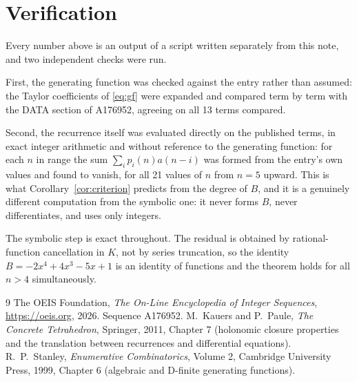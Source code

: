 \documentclass[11pt,a4paper]{article}
\theoremstyle{plain}
\theoremstyle{definition}
\begin{document}
\section{Verification}

Every number above is an output of a script written separately from this note, and two
independent checks were run.

First, the generating function was checked against the entry rather than assumed: the
Taylor coefficients of \eqref{eq:gf} were expanded and compared term by term with the DATA
section of A176952, agreeing on all 13 terms compared.

Second, the recurrence itself was evaluated directly on the published terms, in exact
integer arithmetic and without reference to the generating function: for each $n$ in range
the sum $\sum_{i}p_{i}(n)a(n-i)$ was formed from the entry's own values and found to
vanish, for all 21 values of $n$ from $n=5$ upward. This is what
Corollary~\ref{cor:criterion} predicts from the degree of $B$, and it is a genuinely
different computation from the symbolic one: it never forms $B$, never differentiates, and
uses only integers.

The symbolic step is exact throughout. The residual is obtained by rational-function
cancellation in $K$, not by series truncation, so the identity $B=- 2 x^{4} + 4 x^{3} - 5 x + 1$ is an
identity of functions and the theorem holds for all $n>4$ simultaneously.

\begin{thebibliography}{9}
 The OEIS Foundation, \emph{The On-Line Encyclopedia of Integer Sequences},
\url{https://oeis.org}, 2026. Sequence A176952.
 M.~Kauers and P.~Paule, \emph{The Concrete Tetrahedron}, Springer, 2011,
Chapter 7 (holonomic closure properties and the translation between recurrences and
differential equations).
 R.~P.~Stanley, \emph{Enumerative Combinatorics}, Volume 2, Cambridge
University Press, 1999, Chapter 6 (algebraic and D-finite generating functions).
\end{thebibliography}
\end{document}
